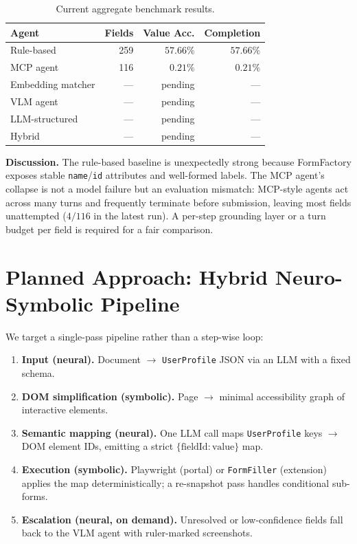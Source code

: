 \documentclass[conference]{IEEEtran}
\begin{document}
\begin{table}[h]
\centering
\caption{Current aggregate benchmark results.}
\label{tab:results}
\begin{tabular}{@{}lrrr@{}}
\toprule
\textbf{Agent} & \textbf{Fields} & \textbf{Value Acc.} & \textbf{Completion} \\
\midrule
Rule-based         & 259 & $\mathbf{57.66\%}$ & $57.66\%$ \\
MCP agent          & 116 & $\phantom{00}0.21\%$ & $\phantom{00}0.21\%$ \\
Embedding matcher  & --- & pending & --- \\
VLM agent          & --- & pending & --- \\
LLM-structured     & --- & pending & --- \\
Hybrid             & --- & pending & --- \\
\bottomrule
\end{tabular}
\end{table}

\textbf{Discussion.} The rule-based baseline is unexpectedly strong
because FormFactory exposes stable \texttt{name}/\texttt{id} attributes
and well-formed labels. The MCP agent's collapse is not a model failure
but an evaluation mismatch: MCP-style agents act across many turns and
frequently terminate before submission, leaving most fields
unattempted ($4/116$ in the latest run). A per-step grounding layer or
a turn budget per field is required for a fair comparison.

\section{Planned Approach: Hybrid Neuro-Symbolic Pipeline}
We target a single-pass pipeline rather than a step-wise loop:

\begin{enumerate}
  \item \textbf{Input (neural).} Document
        $\to$ \texttt{UserProfile} JSON via an LLM with a fixed schema.
  \item \textbf{DOM simplification (symbolic).} Page $\to$ minimal
        accessibility graph of interactive elements.
  \item \textbf{Semantic mapping (neural).} One LLM call maps
        \texttt{UserProfile} keys $\to$ DOM element IDs, emitting a
        strict $\{\text{fieldId}: \text{value}\}$ map.
  \item \textbf{Execution (symbolic).} Playwright (portal) or
        \texttt{FormFiller} (extension) applies the map deterministically;
        a re-snapshot pass handles conditional sub-forms.
  \item \textbf{Escalation (neural, on demand).} Unresolved or
        low-confidence fields fall back to the VLM agent with
        ruler-marked screenshots.
\end{enumerate}
\end{document}
